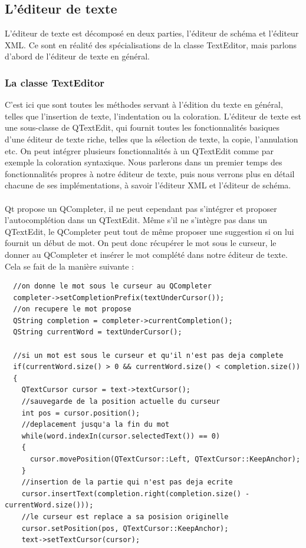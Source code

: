 \subsection{L'éditeur de texte}

L'éditeur de texte est décomposé en deux parties, l'éditeur de schéma et l'éditeur XML. Ce sont en réalité des spécialisations de la classe TextEditor, mais parlons d'abord de l'éditeur de texte en général.
\subsubsection{La classe TextEditor}
C'est ici que sont toutes les méthodes servant à l'édition du texte en général, telles que l'insertion de texte, l'indentation ou la coloration. L'éditeur de texte est une sous-classe de QTextEdit, qui fournit toutes les fonctionnalités basiques d'une éditeur de texte riche, telles que la sélection de texte, la copie, l'annulation etc. On peut intégrer plusieurs fonctionnalités à un QTextEdit comme par exemple la coloration syntaxique. Nous parlerons dans un premier temps des fonctionnalités propres à notre éditeur de texte, puis nous verrons plus en détail chacune de ses implémentations, à savoir l'éditeur XML et l'éditeur de schéma.

\paragraph{}
Qt propose un QCompleter, il ne peut cependant pas s'intégrer et proposer l'autocomplétion dans un QTextEdit. Même s'il ne s'intègre pas dans un QTextEdit, le QCompleter peut tout de même proposer une suggestion si on lui fournit un début de mot. On peut donc récupérer le mot sous le curseur, le donner au QCompleter et insérer le mot complété dans notre éditeur de texte. Cela se fait de la manière suivante :

\begin{lstlisting}
  //on donne le mot sous le curseur au QCompleter
  completer->setCompletionPrefix(textUnderCursor());
  //on recupere le mot propose
  QString completion = completer->currentCompletion();
  QString currentWord = textUnderCursor();

  //si un mot est sous le curseur et qu'il n'est pas deja complete
  if(currentWord.size() > 0 && currentWord.size() < completion.size())
  {
    QTextCursor cursor = text->textCursor();
    //sauvegarde de la position actuelle du curseur
    int pos = cursor.position();
    //deplacement jusqu'a la fin du mot
    while(word.indexIn(cursor.selectedText()) == 0)
    {
      cursor.movePosition(QTextCursor::Left, QTextCursor::KeepAnchor);
    }
    //insertion de la partie qui n'est pas deja ecrite
    cursor.insertText(completion.right(completion.size() - currentWord.size()));
    //le curseur est replace a sa posision originelle
    cursor.setPosition(pos, QTextCursor::KeepAnchor);
    text->setTextCursor(cursor);
\end{lstlisting}
